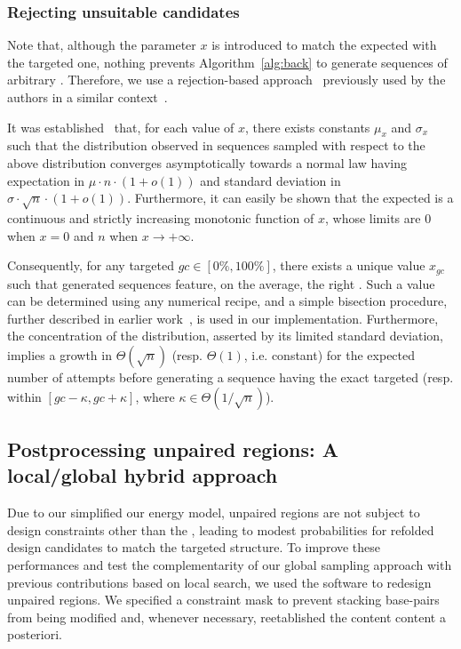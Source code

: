 \subsubsection{Rejecting unsuitable candidates}

Note that, although the parameter $x$ is introduced to match the expected \GCContent with the targeted one, nothing prevents Algorithm~\ref{alg:back} to generate sequences of arbitrary \GCContent. Therefore, we use a rejection-based approach~\cite{Bodini2010} previously used by the authors in a similar context~\cite{Waldispuhl2011}.

It was established~\cite{Waldispuhl2011} that, for each value of $x$, there exists constants $\mu_x$ and $\sigma_x$ such that the \GCContent distribution observed in sequences sampled with respect to the above distribution converges asymptotically towards a normal law having expectation in $\mu\cdot n\cdot(1+o(1))$ and standard deviation in $\sigma\cdot\sqrt{n}\cdot(1+o(1))$.
Furthermore, it can easily be shown that the expected \GCContent is a continuous and strictly increasing monotonic  function of $x$, whose limits are $0$ when $x=0$ and $n$ when $x\to +\infty$. 

Consequently, for any targeted \GCContent $gc\in[0\%,100\%]$, there exists a unique value $x_{gc}$ such that generated sequences feature, on the average, the right \GCContent. Such a value can be determined using any numerical recipe, and a simple bisection procedure, further described in earlier work~\cite{Waldispuhl2011}, is used in our implementation. Furthermore, the concentration of the distribution, asserted by its limited standard deviation, implies a growth in $\Theta(\sqrt{n})$ (resp. $\Theta(1)$, i.e. constant) for the expected number of attempts before generating a sequence having the exact targeted \GCContent  (resp. within $[gc-\kappa,gc+\kappa]$, where $\kappa\in\Theta(1/\sqrt n)$).



\subsection{Postprocessing unpaired regions: A local/global hybrid approach}
\label{subsec:glocal_method}
Due to our simplified our energy model, unpaired regions are not subject to design constraints other than the \GCContent, leading to modest probabilities for refolded design candidates to match the targeted structure. To improve these performances and test the complementarity  of our global sampling approach with previous contributions based on local search, we used the \RNAinverse software to redesign unpaired regions. We specified a constraint mask to prevent stacking base-pairs from being modified and, whenever necessary, reetablished the content content a posteriori.



